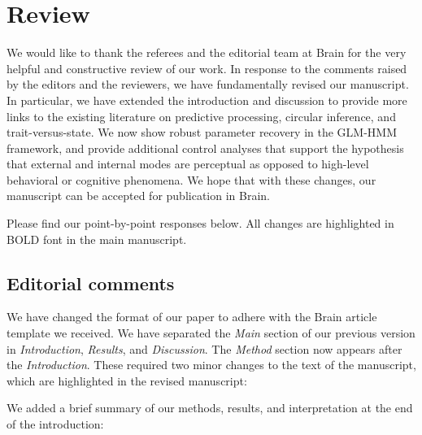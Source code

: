 \documentclass[
]{article}
\begin{document}
\newpage

\section{Review}\label{review}

We would like to thank the referees and the editorial team at Brain for
the very helpful and constructive review of our work. In response to the
comments raised by the editors and the reviewers, we have fundamentally
revised our manuscript. In particular, we have extended the introduction
and discussion to provide more links to the existing literature on
predictive processing, circular inference, and trait-versus-state. We
now show robust parameter recovery in the GLM-HMM framework, and provide
additional control analyses that support the hypothesis that external
and internal modes are perceptual as opposed to high-level behavioral or
cognitive phenomena. We hope that with these changes, our manuscript can
be accepted for publication in Brain.

Please find our point-by-point responses below. All changes are
highlighted in BOLD font in the main manuscript.

\subsection{Editorial comments}\label{editorial-comments}

We have changed the format of our paper to adhere with the Brain article
template we received. We have separated the \emph{Main} section of our
previous version in \emph{Introduction}, \emph{Results}, and
\emph{Discussion}. The \emph{Method} section now appears after the
\emph{Introduction}. These required two minor changes to the text of the
manuscript, which are highlighted in the revised manuscript:

We added a brief summary of our methods, results, and interpretation at
the end of the introduction:
\end{document}
